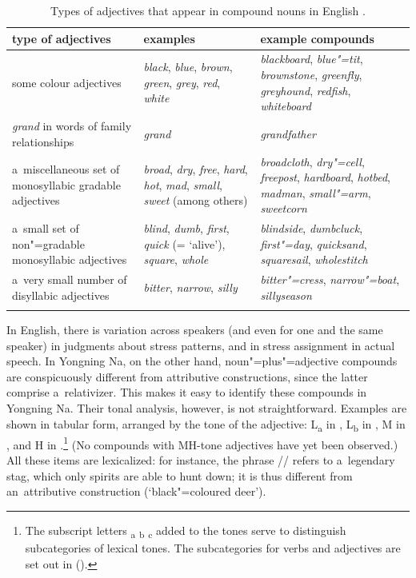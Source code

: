 \begin{table}%
\caption{Types of adjectives that appear in compound nouns in {English} \citep[from][9]{bauer2004}.}
{\renewcommand{\arraystretch}{1.35}
\begin{tabularx}{\textwidth}{ Q Q Q }
\lsptoprule
	type of adjectives & examples & example compounds\\\midrule
	some colour adjectives & \textit{black}, \textit{blue}, \textit{brown}, \textit{green}, \textit{grey}, \textit{red}, \textit{white} & \textit{blackboard}, \textit{blue"=tit},
   \textit{brownstone}, \textit{greenfly}, \textit{greyhound}, \textit{redfish}, \textit{whiteboard}\\
   \textit{grand} in words of family relationships & \textit{grand} & \textit{grandfather}\\
   a~miscellaneous set of {monosyllabic} gradable adjectives & \textit{broad}, \textit{dry}, \textit{free}, \textit{hard}, \textit{hot}, \textit{mad},
   \textit{small}, \textit{sweet} (among others) & \textit{broadcloth}, \textit{dry"=cell}, \textit{freepost}, \textit{hardboard}, \textit{hotbed}, \textit{madman},
   \textit{small"=arm}, \textit{sweetcorn}\\
   a~small set of non"=gradable {monosyllabic} adjectives & \textit{blind}, \textit{dumb}, \textit{first}, \textit{quick} (= ‘alive’),
   \textit{square}, \textit{whole} & \textit{blindside}, \textit{dumbcluck}, \textit{first"=day}, \textit{quicksand}, \textit{squaresail}, \textit{wholestitch}\\ a~very
   small number of disyllabic adjectives & \textit{bitter}, \textit{narrow}, \textit{silly} & \textit{bitter"=cress}, \textit{narrow"=boat},
   \textit{sillyseason}\\
\lspbottomrule
\end{tabularx}}
\label{tab:typesofadjectivesthatappearincompoundnounsinenglish}
\end{table}

\largerpage[-3]
In {English}, there is {variation} across speakers (and even for one and the same speaker) in judgments about stress patterns, and in stress assignment in actual speech. In Yongning Na, on the other hand, noun"=plus"=adjective compounds are conspicuously different from attributive constructions, since the latter comprise a~{relativizer}. This makes it easy to identify these compounds in Yongning Na. Their tonal analysis, however, is not straightforward. Examples are shown in tabular form, arranged by the tone of the adjective: L\textsubscript{a} in , L\textsubscript{b} in , M in , and H in .\footnote{The	subscript letters \textsubscript{a} \textsubscript{b} \textsubscript{c} added to the tones serve to distinguish subcategories of lexical tones. The {subcategories} for verbs and adjectives are set out in  ().} (No compounds with MH-tone adjectives have yet been observed.) All these items are lexicalized: for instance, the phrase // refers to a~legendary stag, which only spirits are able to hunt down; it is thus different from an~attributive
construction (‘black"=coloured deer’).

